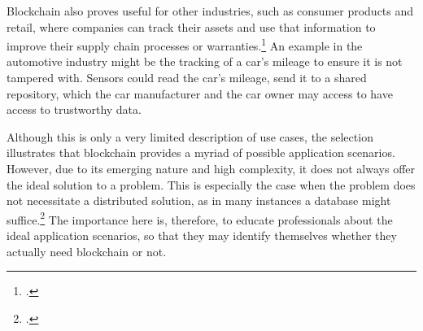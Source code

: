 Blockchain also proves useful for other industries, such as consumer products and retail, where companies can track their assets and use that information to improve their supply chain processes or warranties.\footcite[Cf.][p.31]{GOV.2016} An example in the automotive industry might be the tracking of a car's mileage to ensure it is not tampered with. Sensors could read the car's mileage, send it to a shared repository, which the car manufacturer and the car owner may access to have access to trustworthy data. %

Although this is only a very limited description of use cases, the selection illustrates that blockchain provides a myriad of possible application scenarios. However, due to its emerging nature and high complexity, it does not always offer the ideal solution to a problem. This is especially the case when the problem does not necessitate a distributed solution, as in many instances a database might suffice.\footcites[Cf.][P152, P154]{BerndKammholz_Interview}[cf.][P23]{DanielKaltenbach_Interview} The importance here is, therefore, to educate professionals about the ideal application scenarios, so that they may identify themselves whether they actually need blockchain or not.
